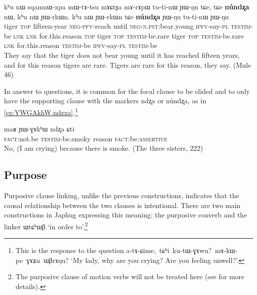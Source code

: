 \documentclass[oldfontcommands,oneside,a4paper,11pt]{article}
\newcommand{\ipa}[1]{{\phon \mbox{#1}}} %
\begin{document}
\begin{exe}
\ex \label{ex:sqamnWxpa.mWtAtsu}
\gll
\ipa{kʰu}  	\ipa{nɯ}  	\ipa{sqamnɯ-xpa}  	\ipa{mɯ-tɤ-tsu}  	\ipa{mɤɕtʂa}  	\ipa{mɤ-rɤpɯ}  	\ipa{tu-ti-nɯ}  	\ipa{ɲɯ-ŋu}  	\ipa{tɕe,}  	\ipa{tɕe}  	\textbf{\ipa{núndʐa}}  	\ipa{nɯ,}  	\ipa{kʰu}  	\ipa{nɯ}  	\ipa{ɲɯ-rkɯn.}  	\ipa{kʰu}  	\ipa{nɯ}  	\ipa{ɲɯ-rkɯn}  	\ipa{tɕe}  	\textbf{\ipa{núndʐa}}  	\ipa{ɲɯ-ŋu}  	\ipa{tu-ti-nɯ}  	\ipa{ɲɯ-ŋu}  \\
tiger \textsc{top} fifteen-year \textsc{neg-pfv}-reach until \textsc{neg-n.pst}:bear.young \textsc{ipfv}-say-\textsc{pl} \textsc{testim}-be \textsc{lnk} \textsc{lnk} for.this.reason \textsc{top} tiger \textsc{top} \textsc{testim}-be.rare tiger \textsc{top} \textsc{testim}-be.rare \textsc{lnk} for.this.reason \textsc{testim}-be \textsc{ipfv}-say-\textsc{pl} \textsc{testim}-be
\\
\glt They say that the tiger does not bear young until it has reached fifteen years, and for this reason tigers are rare. Tigers are rare for this reason, they say. (Mule 46)
\end{exe} 
In answer to questions, it is common for the focal clause to be elided and to only have the supporting clause with the markers \ipa{ndʐa} or \ipa{núndʐa}, as in \ref{ex:YWGAkhW.ndzxa}.\footnote{This is the response to the question \ipa{a-tɤ-ɕime, tɕʰi ku-tɯ-ɣɤwu? mɤ-kɯ-pe ɣɤʑu ɯβrɤŋu?} `My lady, why are you crying? Are you feeling unwell?'.}

\begin{exe}
\ex \label{ex:YWGAkhW.ndzxa}
\gll
\ipa{maʁ}   	\ipa{ɲɯ-ɣɤkʰɯ}   	\ipa{ndʐa}   	\ipa{ɕti}   \\
\textsc{fact}:not.be \textsc{testim}-be.smoky reason \textsc{fact}:be:\textsc{assertive} \\
\glt No, (I am crying) because there is smoke. (The three sisters, 222) 
\end{exe} 
 



\subsection{Purpose} \label{sec:purposive}

Purposive clause linking, unlike the previous constructions, indicates that the causal relationship between the two clauses is intentional. There are two main constructions in Japhug expressing this meaning: the purposive converb and the linker \ipa{ɯtɕʰɯβ} `in order to'.\footnote{The purposive clause of motion verbs will not be treated here (see \citet{jacques13harmonization} for more details).
}
\end{document}
